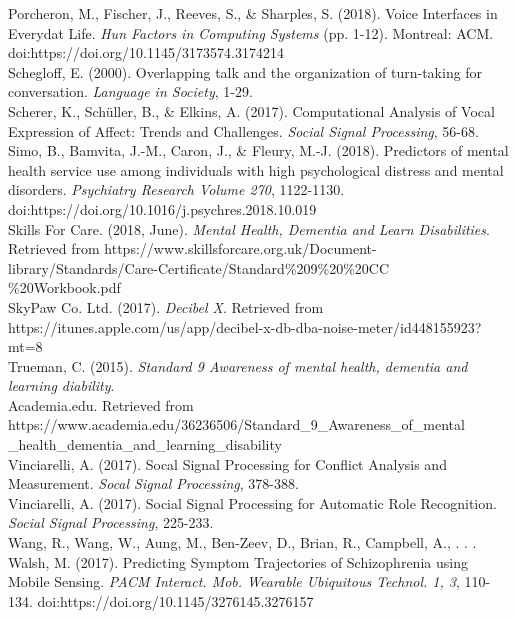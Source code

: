 \documentclass[a4paper,11pt]{report}
\begin{document}
Porcheron, M., Fischer, J., Reeves, S., \& Sharples, S. (2018). Voice Interfaces in Everydat Life. \textit{Hun Factors in Computing Systems} (pp. 1-12). Montreal: ACM. doi:https://doi.org/10.1145/3173574.3174214\\

Schegloff, E. (2000). Overlapping talk and the organization of turn-taking for conversation. \textit{Language in Society}, 1-29.\\

Scherer, K., Schüller, B., \& Elkins, A. (2017). Computational Analysis of Vocal Expression of Affect: Trends and Challenges. \textit{Social Signal Processing}, 56-68.\\

Simo, B., Bamvita, J.-M., Caron, J., \& Fleury, M.-J. (2018). Predictors of mental health service use among individuals with high psychological distress and mental disorders. \textit{Psychiatry Research Volume 270}, 1122-1130. doi:https://doi.org/10.1016/j.psychres.2018.10.019\\

Skills For Care. (2018, June). \textit{Mental Health, Dementia and Learn Disabilities}. Retrieved from https://www.skillsforcare.org.uk/Document-library/Standards/Care-Certificate/Standard\%209\%20\%20CC\\\%20Workbook.pdf\\

SkyPaw Co. Ltd. (2017). \textit{Decibel X}. Retrieved from https://itunes.apple.com/us/app/decibel-x-db-dba-noise-meter/id448155923?mt=8\\

Trueman, C. (2015). \textit{Standard 9 Awareness of mental health, dementia and learning diability}. \\Academia.edu. Retrieved from https://www.academia.edu/36236506/Standard\_9\_Awareness\_of\_mental\\\_health\_dementia\_and\_learning\_disability\\

Vinciarelli, A. (2017). Socal Signal Processing for Conflict Analysis and Measurement. \textit{Socal Signal Processing}, 378-388.\\

Vinciarelli, A. (2017). Social Signal Processing for Automatic Role Recognition. \textit{Social Signal Processing}, 225-233.\\

Wang, R., Wang, W., Aung, M., Ben-Zeev, D., Brian, R., Campbell, A., . . . Walsh, M. (2017). Predicting Symptom Trajectories of Schizophrenia using Mobile Sensing. \textit{PACM Interact. Mob. Wearable Ubiquitous Technol. 1, 3}, 110-134. doi:https://doi.org/10.1145/3276145.3276157\\
\end{document}
